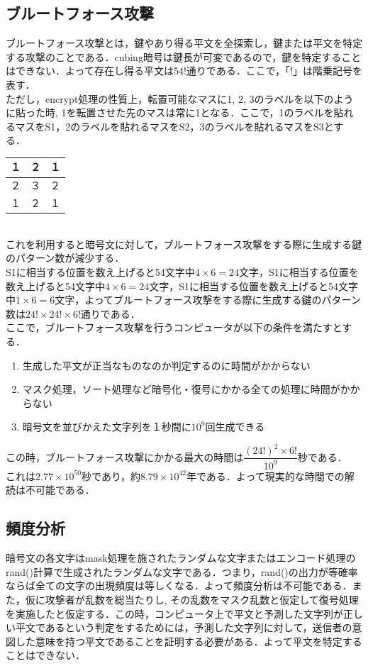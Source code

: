 \documentclass[titlepage]{jarticle}
\begin{document}
\subsection{ブルートフォース攻撃}
ブルートフォース攻撃とは，鍵やあり得る平文を全探索し，鍵または平文を特定する攻撃のことである．cubing暗号は鍵長が可変であるので，鍵を特定することはできない．よって存在し得る平文は\(54!\)通りである．ここで，「\(!\)」は階乗記号を表す．\\
ただし，encrypt処理の性質上，転置可能なマスに1, 2, 3のラベルを以下のように貼った時, 1を転置させた先のマスは常に1となる．ここで，1のラベルを貼れるマスをS1，2のラベルを貼れるマスをS2，3のラベルを貼れるマスをS3とする．\\
\begin{table}[htb]
  \begin{tabular}{|l|c|r|} \hline
    １ & ２ & １ \\ \hline
    ２ & ３ & ２ \\ \hline
    １ & ２ & １ \\ \hline
  \end{tabular}
\end{table}\\
これを利用すると暗号文に対して，ブルートフォース攻撃をする際に生成する鍵のパターン数が減少する．\\
S1に相当する位置を数え上げると54文字中\(4\times6=24\)文字，S1に相当する位置を数え上げると54文字中\(4\times6=24\)文字，S1に相当する位置を数え上げると54文字中\(1\times6=6\)文字，よってブルートフォース攻撃をする際に生成する鍵のパターン数は\(24!\times24!\times6!\)通りである．\\
ここで，ブルートフォース攻撃を行うコンピュータが以下の条件を満たすとする．
\begin{enumerate}
  \item 生成した平文が正当なものなのか判定するのに時間がかからない
  \item マスク処理，ソート処理など暗号化・復号にかかる全ての処理に時間がかからない
  \item 暗号文を並びかえた文字列を１秒間に\(10^9\)回生成できる
\end{enumerate}
この時，ブルートフォース攻撃にかかる最大の時間は\(\dfrac{(24!)^2\times6!}{10^9}\)秒である．\\
これは\(2.77\times10^{50}\)秒であり，約\(8.79\times10^{42}\)年である．よって現実的な時間での解読は不可能である．

\subsection{頻度分析}
暗号文の各文字はmask処理を施されたランダムな文字またはエンコード処理のrand()計算で生成されたランダムな文字である．つまり，rand()の出力が等確率ならば全ての文字の出現頻度は等しくなる．よって頻度分析は不可能である．また，仮に攻撃者が乱数を総当たりし, その乱数をマスク乱数と仮定して復号処理を実施したと仮定する．この時，コンピュータ上で平文と予測した文字列が正しい平文であるという判定をするためには，予測した文字列に対して，送信者の意図した意味を持つ平文であることを証明する必要がある．よって平文を特定することはできない．
\end{document}
